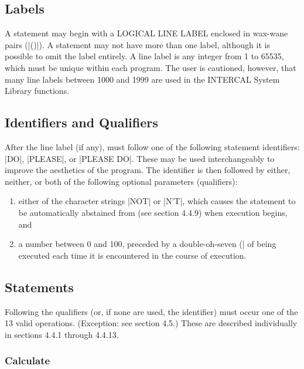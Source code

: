 \subsection{Labels}

A statement may begin with a LOGICAL LINE LABEL enclosed in wax-wane pairs
(|()|).  A statement may not have more than one label, although it is
possible to omit the label entirely.  A line label is any integer from 1 to
65535, which must be unique within each program.  The user is cautioned,
however, that many line labels between 1000 and 1999 are used in the
INTERCAL System Library functions.

\subsection{Identifiers and Qualifiers}

After the line label (if any), must follow one of the following statement
identifiers: |DO|, |PLEASE|, or |PLEASE DO|.  These may be used
interchangeably to improve the aesthetics of the program.  The identifier
is then followed by either, neither, or both of the following optional
parameters (qualifiers):
\begin{enumerate}
\item either of the character strings |NOT| or |N'T|, which causes the statement
to be automatically abstained from (see section 4.4.9) when execution
begins, and
\item a number between 0 and 100, preceded by a double-oh-seven
(|%
of being executed each time it is encountered in the course of execution.
\end{enumerate}







\subsection{Statements} 

Following the qualifiers (or, if none are used, the identifier) must occur
one of the 13 valid operations.  (Exception: see section 4.5.) These are
described individually in sections 4.4.1 through 4.4.13.

\subsubsection{Calculate}


